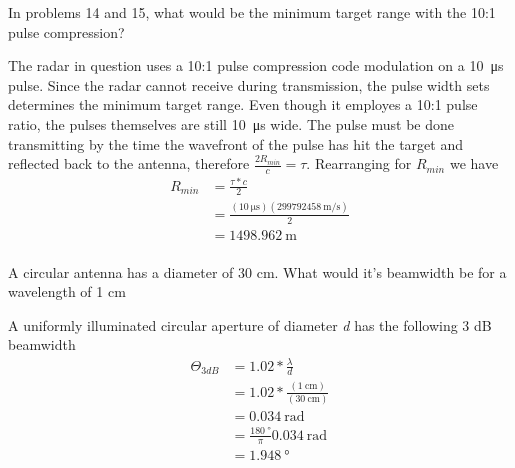 \documentclass[12pt]{article}
\newenvironment{exercise}[2][Exercise]{\begin{trivlist}
    \item[\hskip \labelsep {\bfseries #1}\hskip \labelsep {\bfseries #2.}]}{\end{trivlist}}
\begin{document}
      \begin{exercise}{5}
      In problems 14 and 15, what would be the minimum target range with the 10:1 pulse compression?

      The radar in question uses a 10:1 pulse compression code modulation on a \SI{10}{\us} pulse.  Since the radar cannot receive during transmission, the pulse width sets determines the minimum target range.  Even though it employes a 10:1 pulse ratio, the pulses themselves are still \SI{10}{\us} wide.  The pulse must be done transmitting by the time the wavefront of the pulse has hit the target and reflected back to the antenna, therefore $\frac{ 2 R_{min} }{c} = \tau$.  Rearranging for $R_{min}$ we have
      \begin{align*}
      R_{min} & = \frac{\tau * c}{2}\\
      & = \frac{ (\SI{10}{\us}) (\SI{299792458}{\meter\per\second}) }{ 2 }\\
      & = \SI{1498.962}{\meter}\\
      \end{align*}
      \end{exercise}

      \begin{exercise}{6}
      A circular antenna has a diameter of 30 cm. What would it's beamwidth be for a wavelength of 1 cm 

      A uniformly illuminated circular aperture of diameter \textit{d} has the following 3 dB beamwidth
      \begin{align*}
      \Theta_{3 dB} & = 1.02 * \frac{\lambda}{d}\\
      & = 1.02 * \frac{(\SI{1}{\cm})}{(\SI{30}{\cm})}\\
      & = \SI{0.034}{\radian}\\
      & = \frac{\SI{180}{\degree}}{\pi}\SI{0.034}{\radian}\\
      & = \SI{1.948}{\degree}
      \end{align*}
      \end{exercise}
\end{document}
